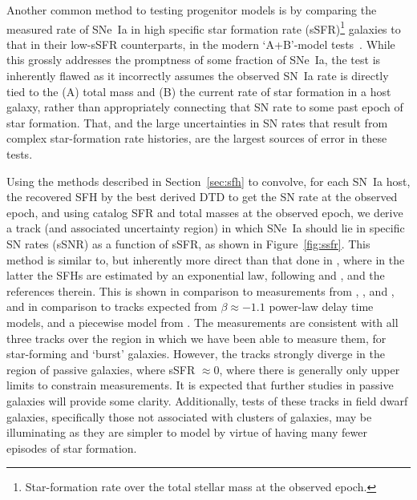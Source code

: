 \documentclass[apj]{aastex62}
\begin{document}
Another common method to testing progenitor models is by comparing the measured rate of SNe~Ia in high specific star formation rate (sSFR)\footnote{Star-formation rate over the total stellar mass at the observed epoch.} galaxies to that in their low-sSFR counterparts, in the modern `A+B'-model tests~\citep{Scannapieco:2005, Andersen:2018dp}. While this grossly addresses the promptness of some fraction of SNe~Ia, the test is inherently flawed as it incorrectly assumes the observed SN~Ia rate is directly tied to the (A) total mass and (B) the current rate of star formation in a host galaxy, rather than appropriately connecting that SN rate to some past epoch of star formation. That, and the large uncertainties in SN rates that result from complex star-formation rate histories, are the largest sources of error in these tests.

Using the methods described in Section~\ref{sec:sfh} to convolve, for each SN~Ia host, the recovered SFH by the best derived DTD to get the SN rate at the observed epoch, and using catalog SFR and total masses at the observed epoch, we derive a track (and associated uncertainty region) in which SNe~Ia should lie in specific SN rates (sSNR) as a function of sSFR, as shown in Figure~\ref{fig:ssfr}. This method is similar to, but inherently more direct than that done in \cite{Graur:2015fk}, where in the latter the SFHs are estimated by an exponential law, following \cite{Gallazzi:2005rf} and
\cite{Kauffmann:2003sj}, and the references therein. This is shown in comparison to measurements from \cite{Mannucci:2005}, \cite{Sullivan:2006a}, and \cite{Smith:2012lr}, and in comparison to tracks expected from $\beta\approx-1.1$ power-law delay time models, and a piecewise model from \cite{Andersen:2018dp}. The measurements are consistent with all three tracks over the region in which we have been able to measure them, for star-forming and `burst' galaxies. However, the tracks strongly diverge in the region of passive galaxies, where sSFR $\approx0$, where there is generally only upper limits to constrain measurements. It is expected that further studies in passive galaxies will provide some clarity. Additionally, tests of these tracks in field dwarf galaxies, specifically those not associated with clusters of galaxies, may be illuminating as they are simpler to model by virtue of having many fewer episodes of star formation. 
\end{document}
